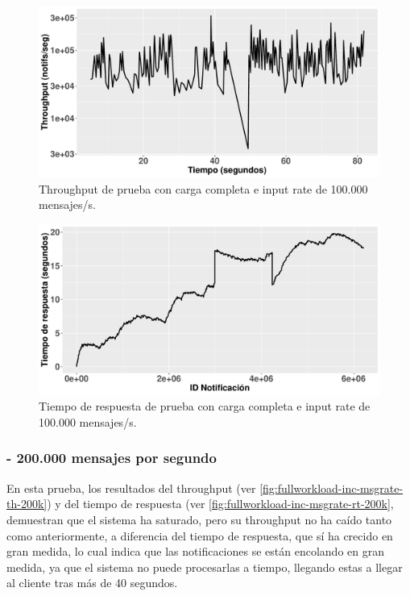 \begin{figure}[htpb]
    \centering
    \includegraphics[width=\textwidth]{images/full-worklad-inc-msgrate/th_full-workload-inc-msgrate_100k.pdf}
    \caption{Throughput de prueba con carga completa e input rate de 100.000 mensajes/s.}
    \label{fig:fullworkload-inc-msgrate-th-100k}
\end{figure}

\begin{figure}[htpb]
    \centering
    \includegraphics[width=\textwidth]{images/full-worklad-inc-msgrate/rt_full-workload-inc-msgrate_100k.pdf}
    \caption{Tiempo de respuesta de prueba con carga completa e input rate de 100.000 mensajes/s.}
    \label{fig:fullworkload-inc-msgrate-rt-100k}
\end{figure}


\subsubsection*{- 200.000 mensajes por segundo}

En esta prueba, los resultados del throughput (ver 
\autoref{fig:fullworkload-inc-msgrate-th-200k}) y del tiempo de respuesta (ver
\autoref{fig:fullworkload-inc-msgrate-rt-200k}, demuestran que el sistema ha 
saturado, pero su throughput no ha caído tanto como anteriormente, a diferencia
del tiempo de respuesta, que sí ha crecido en gran medida, lo cual indica que las
notificaciones se están encolando en gran medida, ya que el sistema no puede 
procesarlas a tiempo, llegando estas a llegar al cliente tras más de 40 segundos.

